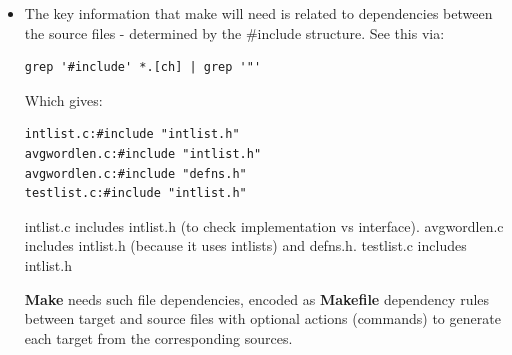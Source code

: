 \documentclass[aspectratio=169]{beamer}
\begin{document}
\begin{frame}[fragile]

    \begin{itemize}
    \item
    The key information that \alert{make} will need is related
    to \alert{dependencies} between the source files - determined by the \alert{\#include} structure.
    \pause
    See this via:
\begin{verbatim}
grep '#include' *.[ch] | grep '"'
\end{verbatim}

    \pitem
    Which gives:
{\small
\begin{verbatim}
intlist.c:#include "intlist.h"
avgwordlen.c:#include "intlist.h"
avgwordlen.c:#include "defns.h"
testlist.c:#include "intlist.h"
\end{verbatim}
}

    \pitem \alert{intlist.c} includes \alert{intlist.h}
            (to check implementation vs interface).
    \pitem \alert{avgwordlen.c} includes \alert{intlist.h} (because it uses intlists) and \alert{defns.h}.
    \pitem \alert{testlist.c} includes \alert{intlist.h}

    \pitem
    {\bf Make} needs such file dependencies,
    encoded as {\bf Makefile} dependency rules between
%
    \alert{target} and \alert{source} files with
    \alert{optional actions} (commands) to generate each
    target from the corresponding sources.
    \end{itemize}

\end{frame}
\end{document}
